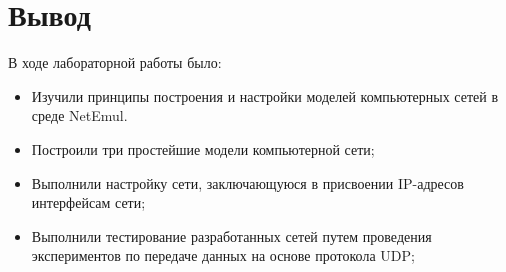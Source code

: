 \documentclass{article}
\begin{document}
\section*{Вывод}

В ходе лабораторной работы было:
\begin{itemize}
    \item Изучили принципы построения и настройки моделей компьютерных
    сетей в среде NetEmul.
    \item Построили три простейшие модели компьютерной сети;
    \item Выполнили настройку сети, заключающуюся в присвоении IP-адресов
    интерфейсам сети;
    \item Выполнили тестирование разработанных сетей путем проведения
    экспериментов по передаче данных на основе протокола UDP;
\end{itemize}
\end{document}
